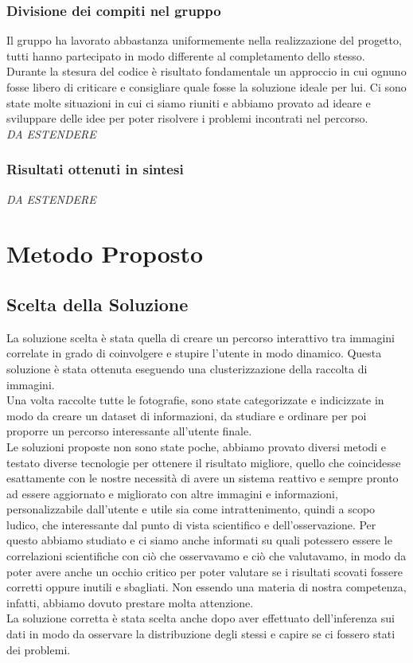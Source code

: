 \documentclass[12pt,a4paper,twoside]{article}
\begin{document}
\subsubsection{Divisione dei compiti nel gruppo}
Il gruppo ha lavorato abbastanza uniformemente nella realizzazione del progetto, tutti hanno partecipato 
in modo differente al completamento dello stesso.\\
Durante la stesura del codice è risultato fondamentale un approccio in cui ognuno fosse libero di 
criticare e consigliare quale fosse la soluzione ideale per lui. Ci sono state molte situazioni in cui 
ci siamo riuniti e abbiamo provato ad ideare e sviluppare delle idee per poter risolvere i problemi 
incontrati nel percorso.\\
\textit{DA ESTENDERE}
\subsubsection{Risultati ottenuti in sintesi}
\textit{DA ESTENDERE}


\newpage
\section{Metodo Proposto}

\subsection{Scelta della Soluzione}
La soluzione scelta è stata quella di creare un percorso interattivo tra immagini correlate in 
grado di coinvolgere e stupire l'utente in modo dinamico. Questa soluzione è stata ottenuta 
eseguendo una clusterizzazione della raccolta di immagini.\\
Una volta raccolte tutte le fotografie, sono state categorizzate e indicizzate in modo da creare 
un dataset di informazioni, da studiare e ordinare per poi proporre un percorso interessante 
all'utente finale.\\
Le soluzioni proposte non sono state poche, abbiamo provato diversi metodi e testato diverse 
tecnologie per ottenere il risultato migliore, quello che coincidesse esattamente con le nostre 
necessità di avere un sistema reattivo e sempre pronto ad essere aggiornato e migliorato con 
altre immagini e informazioni, personalizzabile dall'utente e utile sia come intrattenimento, 
quindi a scopo ludico, che interessante dal punto di vista scientifico e dell'osservazione. Per 
questo abbiamo studiato e ci siamo anche informati su quali potessero essere le correlazioni 
scientifiche con ciò che osservavamo e ciò che valutavamo, in modo da poter avere anche un 
occhio critico per poter valutare se i risultati scovati fossere corretti oppure inutili e 
sbagliati. Non essendo una materia di nostra competenza, infatti, abbiamo dovuto prestare molta 
attenzione.\\
La soluzione corretta è stata scelta anche dopo aver effettuato dell'inferenza sui dati in modo 
da osservare la distribuzione degli stessi e capire se ci fossero stati dei problemi. 
\end{document}
